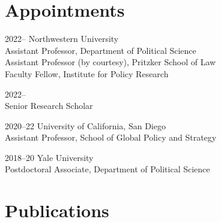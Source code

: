 \documentclass[12pt,letterpaper]{report}
\begin{document}
    \section*{Appointments}

    \begin{tablist}
        \item[2022--]  \tab{}Northwestern University\\
                        Assistant Professor, Department of Political Science \\
                        Assistant Professor (by courtesy), Pritzker School of Law \\
                        Faculty Fellow, Institute for Policy Research \\
                        
                        
        \item[2022--]   \\
                        Senior Research Scholar \\
                        
        \item[2020--22]   \tab{}University of California, San Diego \\
                             Assistant Professor, School of Global Policy and Strategy \\

        \item[2018--20] \tab{}Yale University \\
                             Postdoctoral Associate, Department of Political Science \\ 

    \end{tablist}
    
    \section*{Publications}
\end{document}
